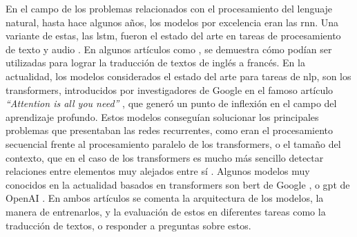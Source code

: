 	En el campo de los problemas relacionados con el procesamiento del lenguaje natural, hasta hace algunos años, los modelos por excelencia eran las \gls{rnn}. Una variante de estas, las \gls{lstm}, fueron el estado del arte en tareas de procesamiento de texto y audio \cite{ea_lstm}. En algunos artículos como \cite{ea_seq}, se demuestra cómo podían ser utilizadas para lograr la traducción de textos de inglés a francés. En la actualidad, los modelos considerados el estado del arte para tareas de \gls{nlp}, son los transformers, introducidos por investigadores de Google en el famoso artículo \textit{``Attention is all you need''} \cite{attention}, que generó un punto de inflexión en el campo del aprendizaje profundo. Estos modelos conseguían solucionar los principales problemas que presentaban las redes recurrentes, como eran el procesamiento secuencial frente al procesamiento paralelo de los transformers, o el tamaño del contexto, que en el caso de los transformers es mucho más sencillo detectar relaciones entre elementos muy alejados entre sí \cite{ea_rnn_transf}. Algunos modelos muy conocidos en la actualidad basados en transformers son \gls{bert} de Google \cite{ea_bert}, o \gls{gpt} de OpenAI \cite{ea_gpt}. En ambos artículos se comenta la arquitectura de los modelos, la manera de entrenarlos, y la evaluación de estos en diferentes tareas como la traducción de textos, o responder a preguntas sobre estos.\\ 
	
